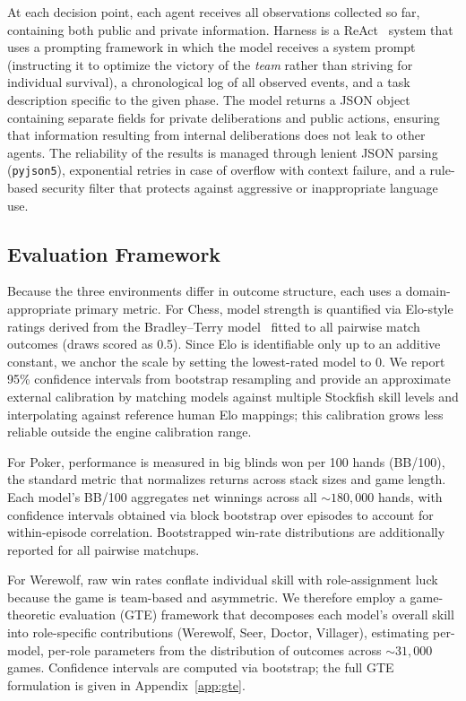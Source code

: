 \documentclass{article}
\begin{document}
At each decision point, each agent receives all observations collected so far, containing both public and private information. Harness is a ReAct~\citep{yao2023react} system that uses a prompting framework in which the model receives a system prompt (instructing it to optimize the victory of the \emph{team} rather than striving for individual survival), a chronological log of all observed events, and a task description specific to the given phase. The model returns a JSON object containing separate fields for private deliberations and public actions, ensuring that information resulting from internal deliberations does not leak to other agents. The reliability of the results is managed through lenient JSON parsing (\texttt{pyjson5}), exponential retries in case of overflow with context failure, and a rule-based security filter that protects against aggressive or inappropriate language use.

\subsection{Evaluation Framework}
\label{sec:eval_framework}

Because the three environments differ in outcome structure, each uses a domain-appropriate primary metric. For Chess, model strength is quantified via Elo-style ratings derived from the Bradley--Terry model~\citep{bradley1952rank} fitted to all pairwise match outcomes (draws scored as 0.5). Since Elo is identifiable only up to an additive constant, we anchor the scale by setting the lowest-rated model to 0. We report 95\% confidence intervals from bootstrap resampling and provide an approximate external calibration by matching models against multiple Stockfish skill levels and interpolating against reference human Elo mappings; this calibration grows less reliable outside the engine calibration range.

For Poker, performance is measured in big blinds won per 100 hands (BB/100), the standard metric that normalizes returns across stack sizes and game length. Each model's BB/100 aggregates net winnings across all ${\sim}180{,}000$ hands, with confidence intervals obtained via block bootstrap over episodes to account for within-episode correlation. Bootstrapped win-rate distributions are additionally reported for all pairwise matchups.

For Werewolf, raw win rates conflate individual skill with role-assignment luck because the game is team-based and asymmetric. We therefore employ a game-theoretic evaluation (GTE) framework that decomposes each model's overall skill into role-specific contributions (Werewolf, Seer, Doctor, Villager), estimating per-model, per-role parameters from the distribution of outcomes across ${\sim}31{,}000$ games. Confidence intervals are computed via bootstrap; the full GTE formulation is given in Appendix~\ref{app:gte}.
\end{document}
